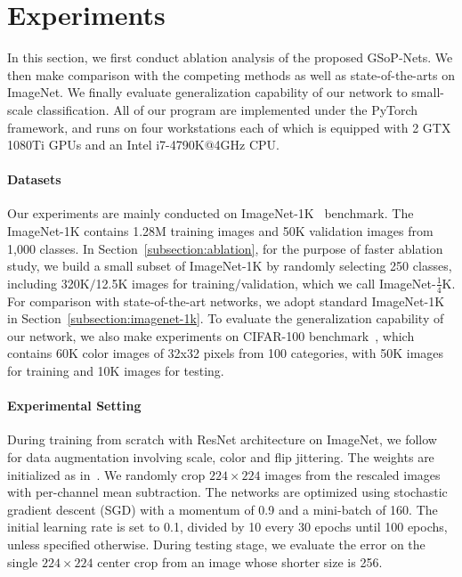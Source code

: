 \documentclass[10pt,twocolumn,letterpaper]{article}
\begin{document}
\section{Experiments}\label{section:experiments}

In this section, we first conduct ablation analysis of the proposed GSoP-Nets. We then make comparison with the competing methods as well as state-of-the-arts on ImageNet. We finally  evaluate generalization capability  of our network to small-scale classification. All of our program are implemented under the PyTorch framework, and runs on four  workstations each of which is equipped with  2 GTX 1080Ti GPUs and an Intel i7-4790K@4GHz CPU.


\vspace{-10pt}\noindent\paragraph{Datasets} Our experiments are mainly conducted on  ImageNet-1K~\cite{imagenet_cvpr09} benchmark. The ImageNet-1K contains 1.28M training images  and 50K validation images from 1,000 classes.  In Section~\ref{subsection:ablation}, for the purpose of faster ablation study, we build a small subset of ImageNet-1K by randomly selecting 250 classes, including 320K$/$12.5K images for  training$/$validation, which we call ImageNet-$\frac{1}{4}$K. For comparison with state-of-the-art networks, we adopt standard ImageNet-1K in Section~\ref{subsection:imagenet-1k}. To evaluate the generalization  capability of our network, we also make experiments on  CIFAR-100 benchmark~\cite{CIFAR}, which   contains 60K color images of 32x32 pixels from 100 categories, with 50K images for training and 10K images for testing. 

\vspace{-10pt}\noindent\paragraph{Experimental Setting}

During training from scratch  with ResNet architecture on ImageNet, we follow~\cite{He_2016_CVPR} for data augmentation  involving scale, color and flip jittering. The weights are initialized as in~\cite{He_2015_ICCV}. We randomly crop  $224\times 224$ images from the rescaled images with per-channel mean subtraction. The networks are optimized using stochastic gradient descent (SGD) with a momentum of 0.9 and a mini-batch of 160. The initial learning rate is set to 0.1, divided by 10 every 30 epochs until 100 epochs, unless specified otherwise. During testing stage, we evaluate the error on the single   $224\times 224$   center crop from an image whose shorter size is 256. 
\end{document}
